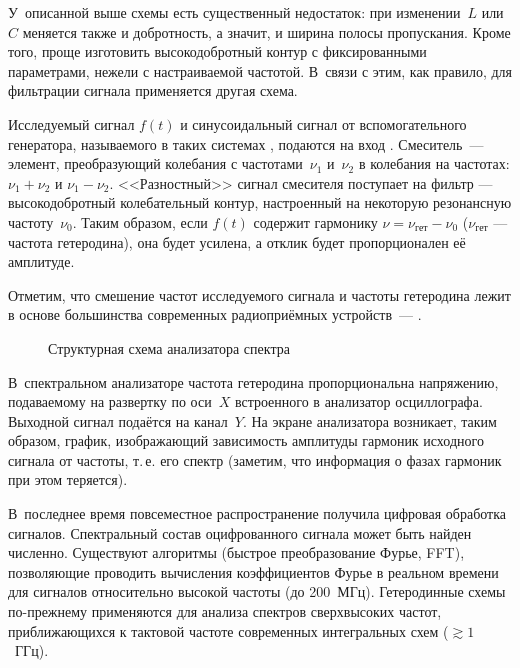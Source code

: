 \experiment

У~описанной выше схемы есть существенный недостаток: при изменении~$L$ или~$C$
меняется также и добротность, а значит, и ширина полосы пропускания.
Кроме того, проще изготовить высокодобротный контур с фиксированными параметрами,
нежели с настраиваемой частотой. В~связи с этим, как правило, для фильтрации сигнала
применяется другая схема.

Исследуемый сигнал $f(t)$ и синусоидальный сигнал от вспомогательного генератора,
называемого в таких системах , подаются на вход . 
Смеситель~--- элемент, преобразующий колебания с частотами~$\nu_1$
и~$\nu_2$ в колебания на 
частотах: $\nu_1 + \nu_2$ и $\nu_1 - \nu_2$.
<<Разностный>> сигнал смесителя поступает на фильтр ---
высокодобротный колебательный контур, настроенный на некоторую 
резонансную частоту~$\nu_0$. Таким образом, если $f(t)$ содержит гармонику
$\nu=\nu_{гет}-\nu_0$ ($\nu_{гет}$ --- частота гетеродина), 
она будет усилена, а отклик будет пропорционален её амплитуде.

Отметим, что смешение частот исследуемого сигнала и частоты гетеродина лежит в
основе большинства современных радиоприёмных устройств~---
.

\begin{figure}[h!]
\centering
{}
\caption{Структурная схема анализатора спектра}
\end{figure}

В~спектральном анализаторе частота гетеродина пропорциональна напряжению,
подаваемому на развертку по оси~$X$ встроенного в анализатор осциллографа.
Выходной сигнал подаётся на канал~$Y$. На экране анализатора возникает, таким
образом, график, изображающий зависимость амплитуды гармоник исходного сигнала
от частоты, т.\,е. его спектр (заметим, что информация о фазах гармоник при этом
теряется).

В~последнее время повсеместное распространение получила цифровая обработка
сигналов. Спектральный состав оцифрованного сигнала может быть найден численно.
Существуют алгоритмы (быстрое преобразование Фурье, FFT), позволяющие проводить
вычисления коэффициентов Фурье в реальном времени для сигналов относительно
высокой частоты (до 200~МГц). Гетеродинные схемы по-прежнему
применяются для анализа спектров сверхвысоких частот, приближающихся
к тактовой частоте современных интегральных схем ($\gtrsim1$~ГГц).

